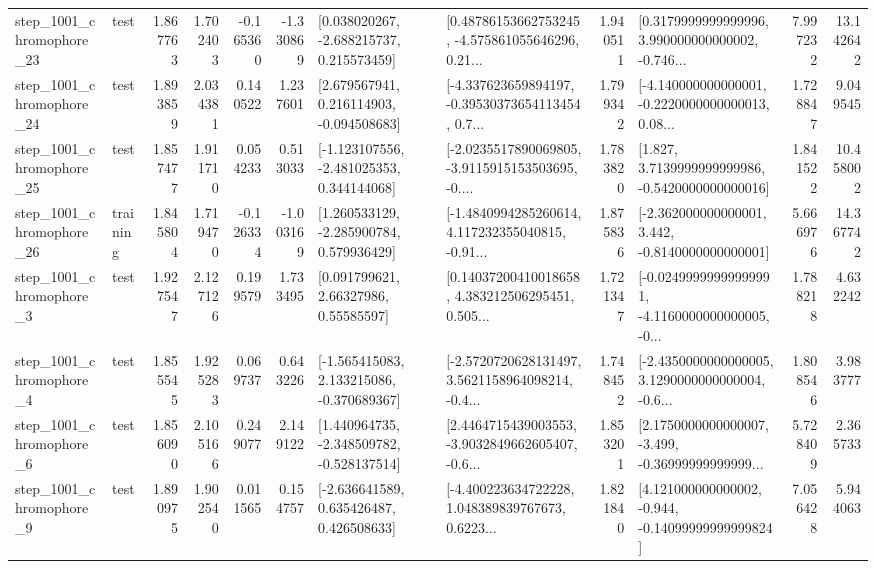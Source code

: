 \begin{tabular}{llrrrrllrlrr}
 step\_1001\_chromophore\_23 &      test &      1.867763 &    1.702403 &     -0.165360 & -1.330869 &    [0.038020267, -2.688215737, 0.215573459] &  [0.48786153662753245, -4.575861055646296, 0.21... &       1.940511 &  [0.3179999999999996, 3.990000000000002, -0.746... &            7.997232 &         13.142642 \\
 step\_1001\_chromophore\_24 &      test &      1.893859 &    2.034381 &      0.140522 &  1.237601 &    [2.679567941, 0.216114903, -0.094508683] &  [-4.337623659894197, -0.39530373654113454, 0.7... &       1.799342 &  [-4.140000000000001, -0.2220000000000013, 0.08... &            1.728847 &          9.049545 \\
 step\_1001\_chromophore\_25 &      test &      1.857477 &    1.911710 &      0.054233 &  0.513033 &   [-1.123107556, -2.481025353, 0.344144068] &  [-2.0235517890069805, -3.9115915153503695, -0.... &       1.783820 &   [1.827, 3.7139999999999986, -0.5420000000000016] &            1.841522 &         10.458002 \\
 step\_1001\_chromophore\_26 &  training &      1.845804 &    1.719470 &     -0.126334 & -1.003169 &    [1.260533129, -2.285900784, 0.579936429] &  [-1.4840994285260614, 4.117232355040815, -0.91... &       1.875836 &   [-2.362000000000001, 3.442, -0.8140000000000001] &            5.666976 &         14.367742 \\
  step\_1001\_chromophore\_3 &      test &      1.927547 &    2.127126 &      0.199579 &  1.733495 &       [0.091799621, 2.66327986, 0.55585597] &  [0.14037200410018658, 4.383212506295451, 0.505... &       1.721347 &  [-0.02499999999999991, -4.1160000000000005, -0... &            1.788218 &          4.632242 \\
  step\_1001\_chromophore\_4 &      test &      1.855545 &    1.925283 &      0.069737 &  0.643226 &   [-1.565415083, 2.133215086, -0.370689367] &  [-2.5720720628131497, 3.5621158964098214, -0.4... &       1.748452 &  [-2.4350000000000005, 3.1290000000000004, -0.6... &            1.808546 &          3.983777 \\
  step\_1001\_chromophore\_6 &      test &      1.856090 &    2.105166 &      0.249077 &  2.149122 &   [1.440964735, -2.348509782, -0.528137514] &  [2.4464715439003553, -3.9032849662605407, -0.6... &       1.853201 &  [2.1750000000000007, -3.499, -0.36999999999999... &            5.728409 &          2.365733 \\
  step\_1001\_chromophore\_9 &      test &      1.890975 &    1.902540 &      0.011565 &  0.154757 &    [-2.636641589, 0.635426487, 0.426508633] &  [-4.400223634722228, 1.048389839767673, 0.6223... &       1.821840 &  [4.121000000000002, -0.944, -0.14099999999999824] &            7.056428 &          5.944063 \\

\end{tabular}
